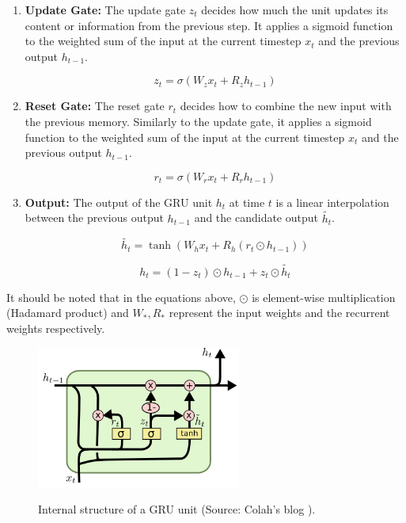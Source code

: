 \documentclass[a4paper, 12pt]{article}
\numberwithin{equation}{section}
\numberwithin{figure}{section}
\numberwithin{table}{section}
\begin{document}
	\begin{enumerate}
		\item \textbf{Update Gate:} The update gate $z_t$ decides how much the unit updates its content or information from the previous step. It applies a sigmoid function to the weighted sum of the input at the current timestep $x_t$ and the previous output $h_{t-1}$.
		
		\begin{equation}
			z_t = \sigma(W_{z}x_{t} + R_{z}h_{t-1})
		\end{equation}
		
		\item \textbf{Reset Gate:} The reset gate $r_t$ decides how to combine the new input with the previous memory. Similarly to the update gate, it applies a sigmoid function to the weighted sum of the input at the current timestep $x_t$ and the previous output $h_{t-1}$.
		
		\begin{equation}
			r_t = \sigma(W_{r}x_{t} + R_{r}h_{t-1})
		\end{equation}
		
		\item \textbf{Output:} The output of the GRU unit $h_t$ at time $t$ is a linear interpolation between the previous output $h_{t-1}$ and the candidate output $\tilde{h_{t}}$.
		
		\begin{equation}
			\tilde{h_{t}} = \tanh(W_{h}x_{t} + R_{h}(r_{t} \odot h_{t-1}))
		\end{equation}
		
		\begin{equation}
			h_{t} = (1 - z_{t}) \odot h_{t-1} + z_{t} \odot \tilde{h_{t}}
		\end{equation}
	\end{enumerate}

	It should be noted that in the equations above, $\odot$ is element-wise multiplication (Hadamard product) and $W_{*}, R_{*}$ represent the input weights and the recurrent weights respectively.
		
	\begin{figure}[H]
		\centering
		\includegraphics[width=0.6\textwidth, height=0.6\textheight, keepaspectratio]{GRU_unit.png}
		\label{fig:GRU}
		\caption[Internal structure of a GRU unit]{Internal structure of a GRU unit (Source: Colah's blog \cite{colah_blog}).}
	\end{figure}
	
\end{document}
